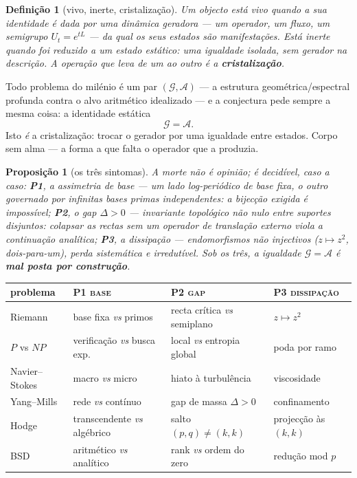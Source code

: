 \documentclass[11pt,a4paper]{article}
\newtheorem{definicao}[teorema]{Definição}
\newtheorem{proposicao}[teorema]{Proposição}
\begin{document}
\begin{definicao}[vivo, inerte, cristalização]
Um objecto está \emph{vivo} quando a sua identidade é dada por uma dinâmica geradora --- um operador,
um fluxo, um semigrupo $U_t=e^{tL}$ --- da qual os seus estados são manifestações. Está \emph{inerte}
quando foi reduzido a um estado estático: uma igualdade isolada, sem gerador na descrição. A operação
que leva de um ao outro é a \textbf{cristalização}.
\end{definicao}

Todo problema do milénio é um par $(\mathcal G,\mathcal A)$ --- a estrutura geométrica/espectral
profunda contra o alvo aritmético idealizado --- e a conjectura pede sempre a mesma coisa: a
identidade estática
\[
  \mathcal G=\mathcal A .
\]
Isto \emph{é} a cristalização: trocar o gerador por uma igualdade entre estados. Corpo sem alma ---
a forma a que falta o operador que a produzia.

\begin{proposicao}[os três sintomas]\label{prop:sintomas}
A morte não é opinião; é decidível, caso a caso:
\textbf{P1}, a \emph{assimetria de base} --- um lado log-periódico de base fixa, o outro governado
por infinitas bases primas independentes: a bijecção exigida é impossível;
\textbf{P2}, o \emph{gap} $\Delta>0$ --- invariante topológico não nulo entre suportes disjuntos:
colapsar as rectas sem um operador de translação externo viola a continuação analítica;
\textbf{P3}, a \emph{dissipação} --- endomorfismos não injectivos ($z\mapsto z^2$, dois-para-um),
perda sistemática e irredutível. Sob os três, a igualdade $\mathcal G=\mathcal A$ é \textbf{mal posta
por construção}.
\end{proposicao}

\begin{center}\small
\renewcommand{\arraystretch}{1.25}
\begin{tabular}{@{}llll@{}}
\toprule
problema & \textsc{P1 base} & \textsc{P2 gap} & \textsc{P3 dissipação} \\
\midrule
Riemann & base fixa \emph{vs} primos & recta crítica \emph{vs} semiplano & $z\mapsto z^{2}$ \\
$P$ vs $NP$ & verificação \emph{vs} busca exp. & local \emph{vs} entropia global & poda por ramo \\
Navier--Stokes & macro \emph{vs} micro & hiato à turbulência & viscosidade \\
Yang--Mills & rede \emph{vs} contínuo & gap de massa $\Delta>0$ & confinamento \\
Hodge & transcendente \emph{vs} algébrico & salto $(p,q)\neq(k,k)$ & projecção às $(k,k)$ \\
BSD & aritmético \emph{vs} analítico & rank \emph{vs} ordem do zero & redução mod $p$ \\
\bottomrule
\end{tabular}
\end{center}
\end{document}
